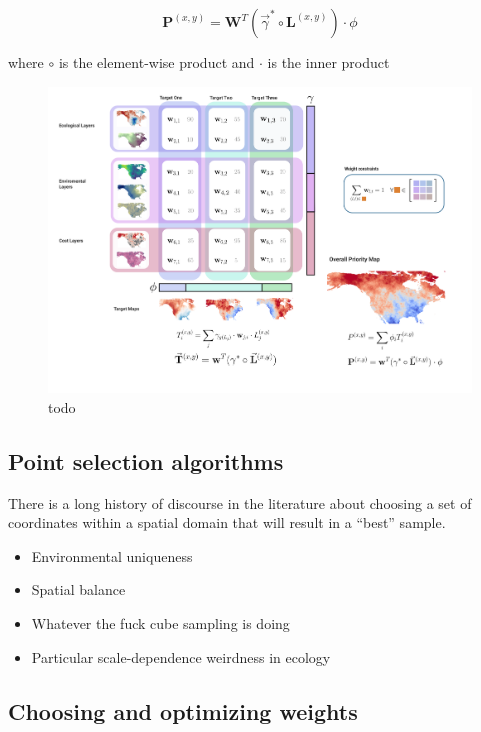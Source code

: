 \documentclass[11pt]{article}
\makeatletter
\def\maxwidth{\ifdim\Gin@nat@width>\linewidth\linewidth
\else\Gin@nat@width\fi}
\let\Oldincludegraphics\includegraphics
\renewcommand{\includegraphics}[1]{\Oldincludegraphics[width=\maxwidth]{#1}}
\makeatother
\begin{document}
\[\mathbf{P}^{(x,y)} = \mathbf{W}^T (\vec{\gamma}^* \circ \mathbf{L}^{(x,y)}) \cdot \phi \]

where \(\circ\) is the element-wise product and \(\cdot\) is the inner
product

\begin{figure}
\hypertarget{fig:concept}{%
\centering
\includegraphics{./figures/weights_concept.png}
\caption{todo}\label{fig:concept}
}
\end{figure}

\hypertarget{point-selection-algorithms}{%
\subsection{Point selection
algorithms}\label{point-selection-algorithms}}

There is a long history of discourse in the literature about choosing a
set of coordinates within a spatial domain that will result in a
``best'' sample.

\begin{itemize}
\tightlist
\item
  Environmental uniqueness
\item
  Spatial balance
\item
  Whatever the fuck cube sampling is doing
\item
  Particular scale-dependence weirdness in ecology
\end{itemize}

\hypertarget{choosing-and-optimizing-weights}{%
\subsection{Choosing and optimizing
weights}\label{choosing-and-optimizing-weights}}
\end{document}
